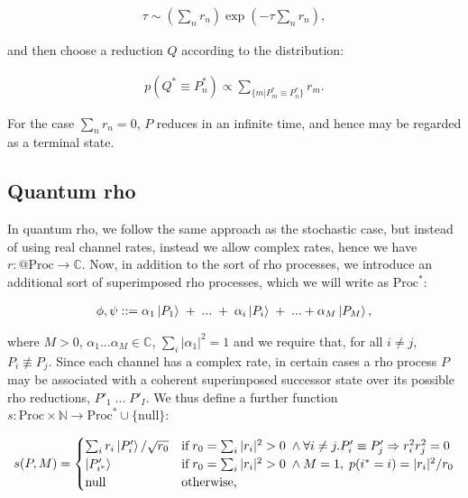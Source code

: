 \begin{eqnarray}
\tau \sim \left(\sum_n r_n\right) \exp\left(-\tau\sum_n r_n\right),
\end{eqnarray}

\noindent and then choose a reduction $Q$ according to the distribution:

\begin{eqnarray}\label{eq:prob_update}
p(Q^*\equiv P^*_n) \propto \sum_{\{m|P^*_m\equiv P^*_n\}} r_m.
\end{eqnarray}

\noindent For the case $\sum_n r_n = 0$, $P$ reduces in an infinite time, and hence may be regarded as a terminal state.

\subsection{Quantum rho}

In quantum rho, we follow the same approach as the stochastic case, but instead of using real channel rates, instead we allow complex rates, hence we have $r:@\text{Proc} \rightarrow \mathbb{C}$.  Now, in addition to the sort of rho processes, we introduce an additional sort of superimposed rho processes, which we will write as $\text{Proc}^*$:

\begin{eqnarray}
\phi, \psi ::= \alpha_1 \ket{P_1} \; + \; ... \; + \; \alpha_i \ket{P_i} \; + \; ...  + \alpha_M \ket{P_M},
\end{eqnarray}

\noindent where $M>0$, $\alpha_1 ... \alpha_M \in \mathbb{C}$, $\sum_i |\alpha_1|^2 = 1$ and we require that, for all $i\neq j$, $P_i \not\equiv P_j$.  Since each channel has a complex rate, in certain cases a rho process $P$ may be associated with a coherent superimposed successor state over its possible rho reductions, $P'_1 \; ... \; P'_I$.  We thus define a further function $s:\text{Proc} \times \mathbb{N} \rightarrow \text{Proc}^*\cup\{\text{null}\}$:

\begin{eqnarray}\label{eq:succ_state}
s(P,M) = 
\begin{cases}
\sum_i r_i \ket{P'_i}/\sqrt{r_0} & \text{if} \; r_0 = \sum_i |r_i|^2 > 0 \; \wedge\forall i\neq j. P'_i \equiv P'_j \Rightarrow r^2_i r^2_j = 0 \\
\ket{P'_{i^*}}
 & \text{if} \; r_0 = \sum_i |r_i|^2 > 0 \; \wedge M=1, \; p(i^*=i)=|r_i|^2/r_0 \\
\text{null} & \text{otherwise,}
\end{cases}\nonumber\\
\end{eqnarray}

